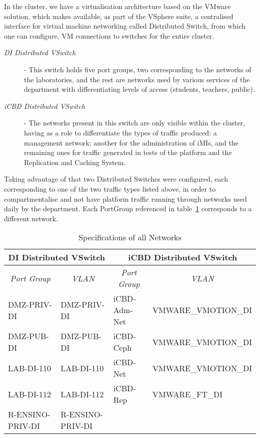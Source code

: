In the cluster, we have a virtualisation architecture based on the VMware solution, which makes available, as part of the VSphere suite, a centralised interface for virtual machine networking called Distributed Switch, from which one can configure, VM connections to switches for the entire cluster. 

\begin{description}
	\item [\textit{DI Distributed VSwitch}] - This switch holds five port groups, two corresponding to the networks of the laboratories, and the rest are networks used by various services of the department with differentiating levels of access (students, teachers, public).
	\item [\textit{iCBD Distributed VSwitch}] - The networks present in this switch are only visible within the cluster, having as a role to differentiate the types of traffic produced: a management network; another for the administration of iMIs, and the remaining ones for traffic generated in tests of the platform and the Replication and Caching System.
\end{description}

Taking advantage of that two Distributed Switches were configured, each corresponding to one of the two traffic types listed above, in order to compartmentalise and not have platform traffic running through networks used daily by the department. Each PortGroup referenced in table~\ref{tab:impl_dvs} corresponds to a different network.

\begin{table}[]
\centering
\begin{tabular}{ll|ll}
\multicolumn{2}{c|}{\textbf{DI Distributed VSwitch}} & \multicolumn{2}{c}{\textbf{iCBD Distributed VSwitch}} \\ \hline
\multicolumn{1}{c}{\textit{Port Group}} & \multicolumn{1}{c|}{\textit{VLAN}} & \multicolumn{1}{c}{\textit{Port Group}} & \multicolumn{1}{c}{\textit{VLAN}} \\
DMZ-PRIV-DI & DMZ-PRIV-DI & iCBD-Adm-Net & VMWARE\_VMOTION\_DI \\
DMZ-PUB-DI & DMZ-PUB-DI & iCBD-Ceph & VMWARE\_VMOTION\_DI \\
LAB-DI-110 & LAB-DI-110 & iCBD-Net & VMWARE\_VMOTION\_DI \\
LAB-DI-112 & LAB-DI-112 & iCBD-Rep & VMWARE\_FT\_DI \\
R-ENSINO-PRIV-DI & R-ENSINO-PRIV-DI &  & 
\end{tabular}
\caption{Specifications of all Networks}
\label{tab:impl_dvs}
\end{table}


